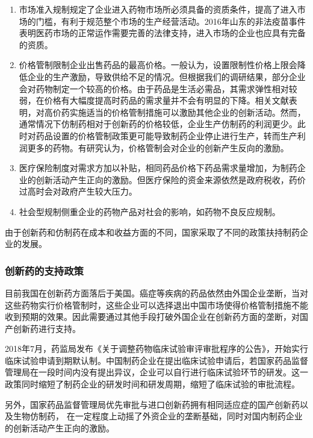 \documentclass{apa6}
\begin{document}
			
			\begin{enumerate}
				\item 市场准入规制规定了企业进入药物市场所必须具备的资质条件，提高了进入市场的门槛，有利于规范整个市场的生产经营活动。2016年山东的非法疫苗事件表明医药市场的正常运作需要完善的法律支持，进入市场的企业也应具有完备的资质。
				
				\item 价格管制限制企业出售药品的最高价格。一般认为，设置限制性价格上限会降低企业的生产激励，导致供给不足的情况。但根据我们的调研结果，部分企业会对药物制定一个较高的价格。由于药品是生活必需品，其需求弹性相对较弱，在价格有大幅度提高时药品的需求量并不会有明显的下降。相关文献表明，对高价药实施适当的价格管制措施可以激励其他企业的创新活动\citep{RN28}。然而，通常情况下仿制药相对于创新药的价格较低，企业生产仿制药的利润更少。此时对药品设置的价格管制政策更可能导致制药企业停止进行生产，转而生产利润更多的药物。有研究认为，价格管制会对企业的创新产生反向的激励\citep{RN27}。
				
				\item 医疗保险制度对需求方加以补贴，相同药品价格下药品需求量增加，为制药企业的创新活动产生正向的激励。但医疗保险的资金来源依然是政府税收，药价过高时会对政府产生较大压力。
				
				\item 社会型规制侧重企业的药物产品对社会的影响，如药物不良反应规制。
			\end{enumerate}
			
			由于创新药和仿制药在成本和收益方面的不同，国家采取了不同的政策扶持制药企业的发展。
			
			\subsubsection{创新药的支持政策}
			
			目前我国在创新药方面落后于美国。癌症等疾病的药品依然由外国企业垄断，当对这些药物实行价格管制时，这些企业可以选择退出中国市场使得价格管制措施不能收到预期的效果。因此需要通过其他手段打破外国企业在创新药方面的垄断，对国产创新药进行支持\citep{RN11}。
			
			2018年7月，药监局发布《关于调整药物临床试验审评审批程序的公告》，开始实行临床试验申请到期默认制。中国制药企业在提出临床试验申请后，若国家药品监督管理局在一段时间内没有提出异议，企业可以自行进行临床试验环节的研发。这一政策同时缩短了制药企业的研发时间和研发周期，缩短了临床试验的审批流程。
			
			另外，国家药品监督管理局优先审批与进口创新药拥有相同适应症的国产创新药以及生物仿制药，%
			在一定程度上动摇了外资企业的垄断基础，同时对国内制药企业的创新活动产生正向的激励。
			
\end{document}
